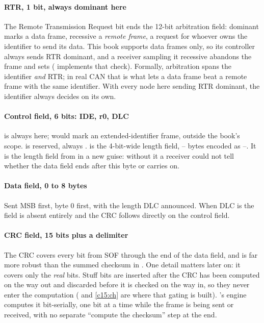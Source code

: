 \paragraph{RTR, 1 bit, always dominant here}
The Remote Transmission Request bit ends the 12-bit arbitration field: dominant marks a data frame,
recessive a \emph{remote frame}, a request for whoever owns the identifier to send its data. This
book supports data frames only, so its controller always sends RTR dominant, and a receiver sampling
it recessive abandons the frame and sets  ( implements that check).
Formally, arbitration spans the identifier \emph{and} RTR; in real CAN that is what lets a data frame
beat a remote frame with the same identifier. With every node here sending RTR dominant, the
identifier always decides on its own.

\paragraph{Control field, 6 bits: IDE, r0, DLC}
 is always  here;  would mark an extended-identifier frame, outside the
book's scope.  is reserved, always .  is the 4-bit-wide length field,
-- bytes encoded as --. It is the length field from
 in a new guise: without it a receiver could not tell whether the data field
ends after this byte or carries on.

\paragraph{Data field, 0 to 8 bytes}
Sent MSB first, byte 0 first, with the length DLC announced. When DLC is  the field is absent
entirely and the CRC follows directly on the control field.

\paragraph{CRC field, 15 bits plus a delimiter}
The CRC covers every bit from SOF through the end of the data field, and is far more robust than the
summed checksum in . One detail matters later on: it covers only the
\emph{real} bits. Stuff bits are inserted after the CRC has been computed on the way out and
discarded before it is checked on the way in, so they never enter the computation (
and \ref{c15:ch} are where that gating is built). 's engine computes it bit-serially,
one bit at a time while the frame is being sent or received, with no separate ``compute the
checksum'' step at the end.

